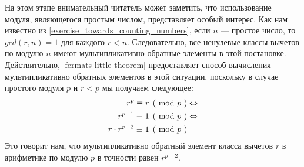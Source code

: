 На этом этапе внимательный читатель может заметить, что использование модуля, являющегося простым числом, представляет особый интерес. Как нам известно из \exercisename{} \ref{exercise_towards_counting_numbers}, если $n$ — простое число, то $gcd(r,n)=1$ для каждого $r<n$. Следовательно, все ненулевые классы вычетов по модулю $n$ имеют мультипликативно обратные элементы в этой постановке. Действительно,  \eqref{fermats-little-theorem} предоставляет способ вычисления мультипликативно обратных элементов в этой ситуации, поскольку в случае простого модуля $p$ и $r<p$ мы получаем следующее:
\begin{align*}
\kongru{r^p}{r}{p} & \Leftrightarrow \\
\kongru{r^{p-1}}{1}{p} & \Leftrightarrow \\
\kongru{r\cdot r^{p-2}}{1}{p}
\end{align*}
Это говорит нам, что мультипликативно обратный элемент класса вычетов $r$ в арифметике по модулю $p$ в точности равен $r^{p-2}$.
